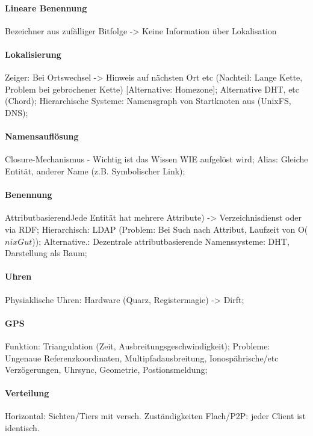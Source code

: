 \documentclass[pagesize,11pt,a4paper]{scrartcl}
\begin{document}
\paragraph*{Lineare Benennung}
	Bezeichner aus zufälliger Bitfolge -> Keine Information über Lokalisation

\paragraph*{Lokalisierung}
	Zeiger: Bei Ortswechsel -> Hinweis auf nächsten Ort etc (Nachteil: Lange Kette, Problem bei gebrochener Kette) [Alternative: Homezone];
	Alternative DHT, etc (Chord);
	Hierarchische Systeme: Namensgraph von Startknoten aus (UnixFS, DNS);

\paragraph*{Namensauflösung}
	Closure-Mechanismus - Wichtig ist das Wissen WIE aufgelöst wird;
	Alias: Gleiche Entität, anderer Name (z.B. Symbolischer Link);

\paragraph*{Benennung}
	AttributbasierendJede Entität hat mehrere Attribute) -> Verzeichnisdienst oder via RDF;
	Hierarchisch: LDAP (Problem: Bei Such nach Attribut, Laufzeit von O($nixGut$));
	Alternative.: Dezentrale attributbasierende Namenssysteme: DHT, Darstellung als Baum;

\paragraph*{Uhren}
	Physiaklische Uhren: Hardware (Quarz, Registermagie) -> Dirft;

\paragraph*{GPS}
	Funktion: Triangulation (Zeit, Ausbreitungsgeschwindigkeit);
	Probleme: Ungenaue Referenzkoordinaten, Multipfadausbreitung, Ionospährische/etc Verzögerungen, Uhrsync, Geometrie, Postionsmeldung;
	
\paragraph*{Verteilung}
	Horizontal: Sichten/Tiers mit versch. Zuständigkeiten
	Flach/P2P: jeder Client ist identisch.
\end{document}
